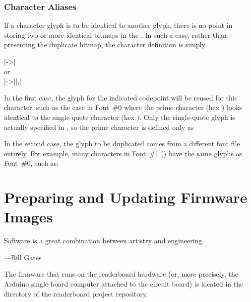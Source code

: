 \subsection{Character Aliases}
If a character glyph is to be identical to another glyph, there is no point
in storing two or more identical bitmaps in the . In such a case,
rather than presenting the duplicate bitmap, the character definition
is simply
\begin{center}
	\begin{Coding}
		|->|\\
		or\\
		|->||,|
	\end{Coding}
\end{center}
In the first case, the glyph for the indicated codepoint will be reused for this character,
such as the case in Font~\#0 where the prime character (hex ) looks identical to
the single-quote character (hex ). Only the single-quote glyph is actually specified
in , so the prime character is defined only as

In the second case, the glyph to be duplicated comes from a different font file entirely.
For example, many characters in Font~\#1 () have the same glyphs
as Font~\#0, such as:

%                                                     
\chapter{Preparing and Updating Firmware Images}\label{chap:firmware}
\epigraph{Software is a great combination between artistry and engineering.}{---Bill Gates}
The firmware that runs on the readerboard hardware (or, more precisely, the Arduino single-board
computer attached to the circuit board) is located in the  directory of the
readerboard project repository.

